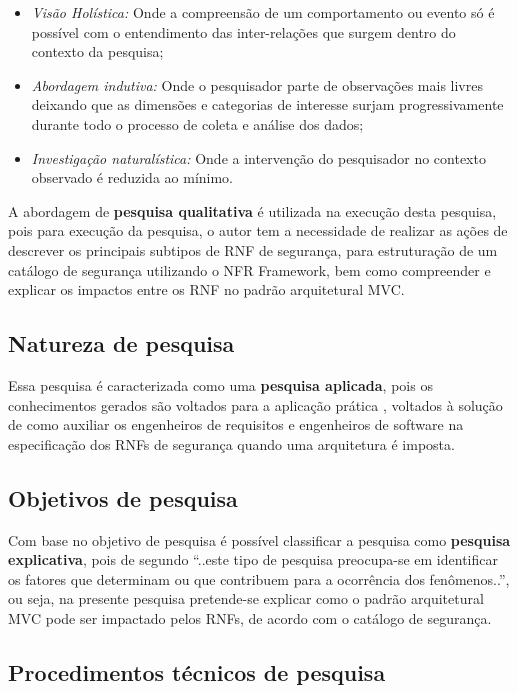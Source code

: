 \begin{itemize}
	\item \textit{Visão Holística:} Onde a compreensão de um comportamento ou evento só é possível com o entendimento das inter-relações que surgem dentro do contexto da pesquisa;
	\item \textit{Abordagem indutiva:} Onde o pesquisador parte de observações mais livres deixando que as dimensões e categorias de interesse surjam progressivamente durante todo o processo de coleta e análise dos dados;
	\item \textit{Investigação naturalística:} Onde a intervenção do pesquisador no contexto observado é reduzida ao mínimo.
\end{itemize}

A abordagem de \textbf{pesquisa qualitativa} é utilizada na execução desta pesquisa, pois para execução da pesquisa, o autor tem a necessidade de realizar as ações de descrever os principais subtipos de RNF de segurança, para estruturação de um catálogo de segurança utilizando o NFR Framework, bem como compreender e explicar os impactos entre os RNF no padrão arquitetural MVC. 

\subsection{Natureza de pesquisa}

Essa pesquisa é caracterizada como uma \textbf{pesquisa aplicada}, pois os conhecimentos gerados são voltados para a aplicação prática \cite{gerhardt2009metodos}, voltados à solução de como auxiliar os engenheiros de requisitos e engenheiros de software na especificação dos RNFs de segurança quando uma arquitetura é imposta. 

\subsection{Objetivos de pesquisa}

Com base no objetivo de pesquisa é possível classificar a pesquisa como \textbf{pesquisa explicativa}, pois de segundo \cite{gil2002elaborar} “..este tipo de pesquisa preocupa-se em identificar os fatores que determinam ou que contribuem para a ocorrência dos fenômenos..”, ou seja, na presente pesquisa pretende-se explicar como o padrão arquitetural MVC pode ser impactado pelos RNFs, de acordo com o catálogo de segurança.

\subsection{Procedimentos técnicos de pesquisa}

